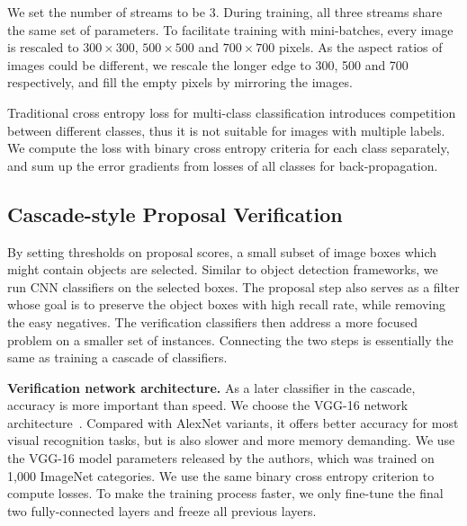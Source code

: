\documentclass[10pt,twocolumn,letterpaper]{article}
\begin{document}
We set the number of streams to be 3. During training, all three streams share the same set of parameters. To facilitate training with mini-batches, every image is rescaled to $300\times 300$, $500\times 500$ and $700\times 700$ pixels. As the aspect ratios of images could be different, we rescale the longer edge to 300, 500 and 700 respectively, and fill the empty pixels by mirroring the images. 

Traditional cross entropy loss for multi-class classification introduces competition between different classes, thus it is not suitable for images with multiple labels. We compute the loss with binary cross entropy criteria for each class separately, and sum up the error gradients from losses of all classes for back-propagation. %

\subsection{Cascade-style Proposal Verification}
By setting thresholds on proposal scores, a small subset of image boxes which might contain objects are selected. Similar to object detection frameworks, we run CNN classifiers on the selected boxes. The proposal step also serves as a filter whose goal is to preserve the object boxes with high recall rate, while removing the easy negatives. The verification classifiers then address a more focused problem on a smaller set of instances. Connecting the two steps is essentially the same as training a cascade of classifiers.

\textbf{Verification network architecture.} As a later classifier in the cascade, accuracy is more important than speed. We choose the VGG-16 network architecture~\cite{Simonyan14c}. Compared with AlexNet variants, it offers better accuracy for most visual recognition tasks, but is also slower and more memory demanding. We use the VGG-16 model parameters released by the authors, which was trained on 1,000 ImageNet categories. We use the same binary cross entropy criterion to compute losses. To make the training process faster, we only fine-tune the final two fully-connected layers and freeze all previous layers.
\end{document}

